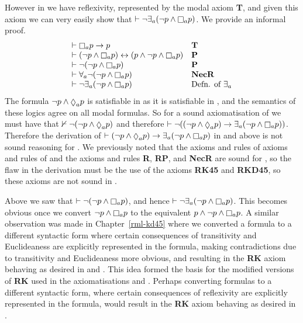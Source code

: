 However in \logicRmlS{} we have reflexivity, represented by the modal axiom {\bf T}, and given this axiom we can very easily show that $\proves \lnot \somerefsA (\lnot \atomP \land \necessaryA \atomP)$.
We provide an informal proof.
$$
\begin{array}{ll}
    \proves \necessaryA \atomP \implies \atomP & {\bf T}\\
    \proves (\lnot \atomP \land \necessaryA \atomP) \iff (\atomP \land \lnot \atomP \land \necessaryA \atomP) & {\bf P}\\
    \proves \lnot (\lnot \atomP \land \necessaryA \atomP) & {\bf P}\\
    \proves \allrefsA \lnot (\lnot \atomP \land \necessaryA \atomP) & {\bf NecR}\\
    \proves \lnot \somerefsA (\lnot \atomP \land \necessaryA \atomP) & \text{Defn. of $\somerefsA$}
\end{array}
$$
The formula $\lnot \atomP \land \possibleA \atomP$ is satisfiable in \logicRmlS{} as it is satisfiable in \logicS{}, and the semantics of these logics agree on all modal formulas.
So for a sound axiomatisation of \logicRmlS{} we must have that $\nproves \lnot (\lnot \atomP \land \possibleA \atomP)$ and therefore $\proves \lnot ((\lnot \atomP \land \possibleA \atomP) \implies \somerefsA (\lnot \atomP \land \necessaryA \atomP))$.
Therefore the derivation of $\proves (\lnot \atomP \land \possibleA \atomP) \implies \somerefsA (\lnot \atomP \land \necessaryA \atomP)$ in \axiomRmlKFF{} and \axiomRmlKD{} above is not sound reasoning for \logicRmlS{}.
We previously noted that the axioms and rules of axioms and rules of \axiomS{} and the axioms and rules {\bf R}, {\bf RP}, and {\bf NecR} are sound for \logicRmlS{}, so the flaw in the derivation must be the use of the axioms {\bf RK45} and {\bf RKD45}, so these axioms are not sound in \logicRmlS{}.

Above we saw that $\proves \lnot (\lnot \atomP \land \necessaryA \atomP)$, and hence $\proves \lnot \somerefsA (\lnot \atomP \land \necessaryA \atomP)$.
This becomes obvious once we convert $\lnot \atomP \land \necessaryA \atomP$ to the equivalent $\atomP \land \lnot \atomP \land \necessaryA \atomP$.
A similar observation was made in Chapter~\ref{rml-kd45} where we converted a formula to a different syntactic form where certain consequences of transitivity and Euclideaness are explicitly represented in the formula, making contradictions due to transitivity and Euclideaness more obvious, and resulting in the {\bf RK} axiom behaving as desired in \logicRmlKFF{} and \logicRmlKD{}.
This idea formed the basis for the modified versions of {\bf RK} used in the axiomatisations \axiomRmlKFF{} and \axiomRmlKD{}.
Perhaps converting formulas to a different syntactic form, where certain consequences of reflexivity are explicitly represented in the formula, would result in the {\bf RK} axiom behaving as desired in \logicRmlS{}.  

